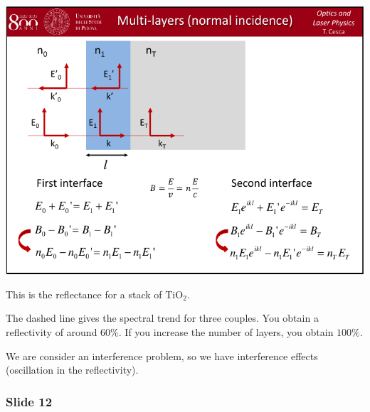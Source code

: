 \documentclass[../main/main.tex]{subfiles}
\begin{document}
\begin{minipage}[]{0.5\linewidth}
\centering
\includegraphics[page=11,width=1\textwidth]{../lessons/pdf_file/06_lecture.pdf}
\end{minipage}
\hspace{0.3cm}\vspace{0.3cm}
\begin{minipage}[c]{0.47\linewidth}

This is the reflectance for a stack of \( \text{TiO}_2 \).

The dashed line gives the spectral trend for three couples. You obtain a reflectivity of around \( 60 \% \). If you increase the number of layers, you obtain \( 100 \% \).

We are consider an interference problem, so we have interference effects (oscillation in the reflectivity).

\end{minipage}

\subsubsection*{Slide 12}
\end{document}
